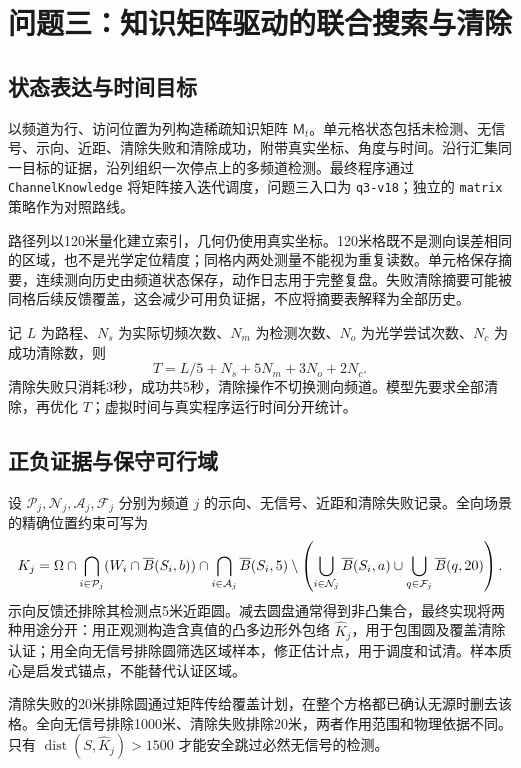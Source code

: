 \section{问题三：知识矩阵驱动的联合搜索与清除}
\subsection{状态表达与时间目标}
以频道为行、访问位置为列构造稀疏知识矩阵 $\mathsf M_t$。单元格状态包括未检测、无信号、示向、近距、清除失败和清除成功，附带真实坐标、角度与时间。沿行汇集同一目标的证据，沿列组织一次停点上的多频道检测。最终程序通过 \texttt{ChannelKnowledge} 将矩阵接入迭代调度，问题三入口为 \texttt{q3-v18}；独立的 \texttt{matrix} 策略作为对照路线。

路径列以120米量化建立索引，几何仍使用真实坐标。120米格既不是测向误差相同的区域，也不是光学定位精度；同格内两处测量不能视为重复读数。单元格保存摘要，连续测向历史由频道状态保存，动作日志用于完整复盘。失败清除摘要可能被同格后续反馈覆盖，这会减少可用负证据，不应将摘要表解释为全部历史。

记 $L$ 为路程、$N_s$ 为实际切频次数、$N_m$ 为检测次数、$N_o$ 为光学尝试次数、$N_c$ 为成功清除数，则
\begin{equation}
T=L/5+N_s+5N_m+3N_o+2N_c.\label{eq:time}
\end{equation}
清除失败只消耗3秒，成功共5秒，清除操作不切换测向频道。模型先要求全部清除，再优化 $T$；虚拟时间与真实程序运行时间分开统计。

\subsection{正负证据与保守可行域}
设 $\mathcal P_j,\mathcal N_j,\mathcal A_j,\mathcal F_j$ 分别为频道 $j$ 的示向、无信号、近距和清除失败记录。全向场景的精确位置约束可写为
\begin{equation}
K_j=\Omega\cap\bigcap_{i\in\mathcal P_j}(W_i\cap\overline B(S_i,b))
\cap\bigcap_{i\in\mathcal A_j}\overline B(S_i,5)
\setminus\left(\bigcup_{i\in\mathcal N_j}\overline B(S_i,a)
\cup\bigcup_{q\in\mathcal F_j}\overline B(q,20)\right).
\end{equation}
示向反馈还排除其检测点5米近距圆。减去圆盘通常得到非凸集合，最终实现将两种用途分开：用正观测构造含真值的凸多边形外包络 $\widehat K_j$，用于包围圆及覆盖清除认证；用全向无信号排除圆筛选区域样本，修正估计点，用于调度和试清。样本质心是启发式锚点，不能替代认证区域。

清除失败的20米排除圆通过矩阵传给覆盖计划，在整个方格都已确认无源时删去该格。全向无信号排除1000米、清除失败排除20米，两者作用范围和物理依据不同。只有 $\operatorname{dist}(S,\widehat K_j)>1500$ 才能安全跳过必然无信号的检测。

